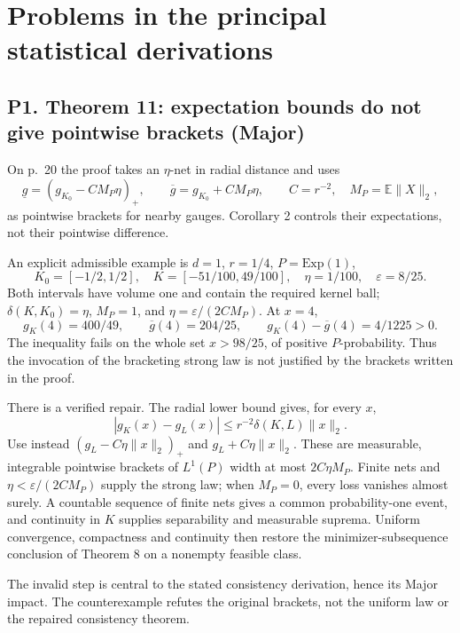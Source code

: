 \documentclass[10pt]{article}
\begin{document}
\section*{Problems in the principal statistical derivations}
\subsection*{P1. Theorem 11: expectation bounds do not give pointwise brackets (Major)}
On p. 20 the proof takes an \(\eta\)-net in radial distance and uses \[\underline g=(g_{K_0}-CM_P\eta)_+,\qquad
\overline g=g_{K_0}+CM_P\eta,\qquad C=r^{-2},\quad M_P=\mathbb E\|X\|_2,\] as pointwise brackets for nearby gauges. Corollary 2 controls their expectations, not their pointwise difference.\par
An explicit admissible example is \(d=1\), \(r=1/4\), \(P=\mathrm{Exp}(1)\), \[K_0=[-1/2,1/2],\quad K=[-51/100,49/100],\quad
\eta=1/100,\quad \varepsilon=8/25.\] Both intervals have volume one and contain the required kernel ball; \(\delta(K,K_0)=\eta\), \(M_P=1\), and \(\eta=\varepsilon/(2CM_P)\). At \(x=4\), \[g_K(4)=400/49,\qquad \overline g(4)=204/25,\qquad
g_K(4)-\overline g(4)=4/1225>0.\] The inequality fails on the whole set \(x>98/25\), of positive \(P\)-probability. Thus the invocation of the bracketing strong law is not justified by the brackets written in the proof.\par
There is a verified repair. The radial lower bound gives, for every \(x\), \[|g_K(x)-g_L(x)|\le r^{-2}\delta(K,L)\|x\|_2.\] Use instead \((g_L-C\eta\|x\|_2)_+\) and \(g_L+C\eta\|x\|_2\). These are measurable, integrable pointwise brackets of \(L^1(P)\) width at most \(2C\eta M_P\). Finite nets and \(\eta<\varepsilon/(2CM_P)\) supply the strong law; when \(M_P=0\), every loss vanishes almost surely. A countable sequence of finite nets gives a common probability-one event, and continuity in \(K\) supplies separability and measurable suprema. Uniform convergence, compactness and continuity then restore the minimizer-subsequence conclusion of Theorem 8 on a nonempty feasible class.\par
The invalid step is central to the stated consistency derivation, hence its Major impact. The counterexample refutes the original brackets, not the uniform law or the repaired consistency theorem.\par
\end{document}
